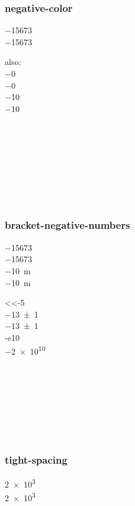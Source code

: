 \documentclass{article}
\begin{document}
\subsubsection{negative-color}
\num{-15673} \\
\num[negative-color = red]{-15673}

also:\\
\num[negative-color = red]{-0}\\
\num[negative-color = red, retain-negative-zero]{-0}\\
\num[color=green,negative-color=red]{-10}\\
\num[negative-color=red,color=green]{-10}

{
\\
\\
\\
\\
\\
\\
\\
}

\subsubsection{bracket-negative-numbers}
\num{-15673} \\
\num[bracket-negative-numbers]{-15673} \\
\qty{-10}{\metre} \\
\qty[bracket-negative-numbers]{-10}{\metre}

{
\num{<<-5}\\
\num{-13(1)}\\
\num{-13+-1}\\
\num{-e10}\\
\num{-2e10}\\
\\
\\
\\
\\
\\
\\
\\
}

\subsubsection{tight-spacing} %
\num{2e3} \\
\num[tight-spacing = true]{2e3}
\end{document}
